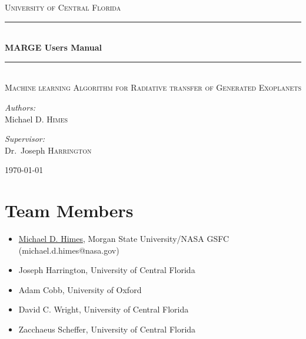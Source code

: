 \documentclass[letterpaper, 12pt]{article}
\begin{document}
\begin{titlepage}
\begin{center}

\textsc{\LARGE University of Central Florida}\\[1.5cm]

\rule{\linewidth}{0.5mm} \\[0.4cm]
{ \huge \bfseries MARGE Users Manual \\[0.4cm] }
\rule{\linewidth}{0.5mm} \\[1.0cm]

\textsc{\Large Machine learning Algorithm for Radiative transfer of Generated Exoplanets}\\[1.5cm]

\noindent
\begin{minipage}{0.4\textwidth}
\begin{flushleft}
\large
\emph{Authors:} \\
Michael D. \textsc{Himes} \\
\end{flushleft}
\end{minipage}%
\begin{minipage}{0.4\textwidth}
\begin{flushright} \large
\emph{Supervisor:} \\
Dr.~Joseph \textsc{Harrington}
\end{flushright}
\end{minipage}
\vfill

{\large \today}

\end{center}
\end{titlepage}

\tableofcontents
\newpage

\section{Team Members}
\label{sec:team}

\begin{itemize}
\item \href{https://github.com/mdhimes/}{Michael D. Himes}, 
                 Morgan State University/NASA GSFC (michael.d.himes@nasa.gov)
\item Joseph Harrington, University of Central Florida
\item Adam Cobb, University of Oxford
\item David C. Wright, University of Central Florida
\item Zacchaeus Scheffer, University of Central Florida
\end{itemize}
\end{document}
